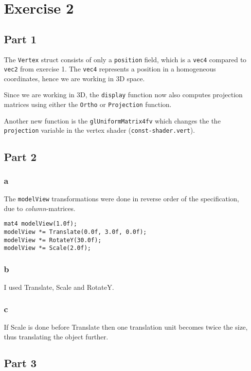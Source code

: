 \section{Exercise 2}

\subsection{Part 1}
The \texttt{Vertex} struct consists of only a \texttt{position} field, which is a \texttt{vec4} compared to \texttt{vec2} from exercise 1. The \texttt{vec4} represents a position in a homogeneous coordinates, hence we are working in 3D space.

Since we are working in 3D, the \texttt{display} function now also computes projection matrices using either the \texttt{Ortho} or \texttt{Projection} function.

Another new function is the \texttt{glUniformMatrix4fv} which changes the the \texttt{projection} variable in the vertex shader (\texttt{const-shader.vert}).

\subsection{Part 2}

\subsubsection{a}
The \texttt{modelView} transformations were done in reverse order of the specification, due to \textit{column}-matrices.

\begin{lstlisting}
mat4 modelView(1.0f);
modelView *= Translate(0.0f, 3.0f, 0.0f);
modelView *= RotateY(30.0f);
modelView *= Scale(2.0f);
\end{lstlisting}


\subsubsection{b}
I used Translate, Scale and RotateY.

\subsubsection{c}
If Scale is done before Translate then one translation unit becomes twice the size, thus translating the object further.

\subsection{Part 3}

